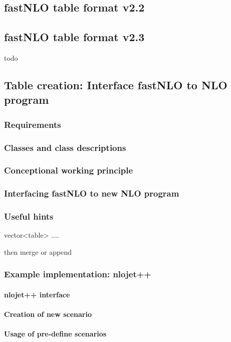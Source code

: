 \documentclass[a4paper,11pt]{article}
\begin{document}
\subsection{fastNLO table format v2.2}

\subsection{fastNLO table format v2.3}
todo

\subsection{Table creation: Interface fastNLO to NLO program}
\subsubsection{Requirements}
\subsubsection{Classes and class descriptions}
\subsubsection{Conceptional working principle}
\subsubsection{Interfacing fastNLO to new NLO program}
\subsubsection{Useful hints}
vector<table> ....

then merge or append

\subsubsection{Example implementation: nlojet++}
\paragraph{nlojet++ interface}
\paragraph{Creation of new scenario}
\paragraph{Usage of pre-define scenarios}
\end{document}
